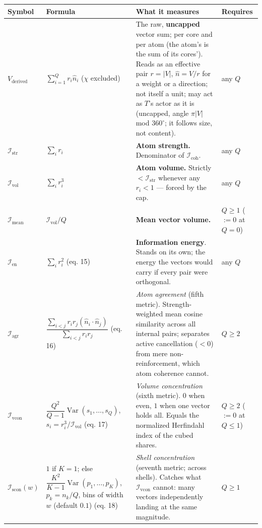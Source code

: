 \documentclass[10.5pt]{article}
\begin{document}
{\small\setlength{\tabcolsep}{4pt}\begin{longtable}{L{1.8cm}L{4.0cm}L{8.1cm}L{2.1cm}}
\toprule
\textbf{Symbol} & \textbf{Formula} & \textbf{What it measures} & \textbf{Requires} \\
\midrule
\endhead
$V_{\text{derived}}$ & $\displaystyle\sum_{i=1}^{Q}r_i\hat n_i$ ($\chi$ excluded) & The raw, \textbf{uncapped} vector sum; per core and per atom (the atom's is the sum of its cores'). Reads as an effective pair $r=\lvert V\rvert$, $\hat n=V/r$ for a weight or a direction; not itself a unit; may act as $T$'s actor as it is (uncapped, angle $\pi\lvert V\rvert$ mod $360^\circ$; it follows size, not content). & any $Q$ \\
$\mathcal{I}_{\mathrm{str}}$ & $\displaystyle\sum_ir_i$ & \textbf{Atom strength.} Denominator of $\mathcal{I}_{\mathrm{coh}}$. & any $Q$ \\
$\mathcal{I}_{\mathrm{vol}}$ & $\displaystyle\sum_ir_i^3$ & \textbf{Atom volume.} Strictly $<\mathcal{I}_{\mathrm{str}}$ whenever any $r_i<1$ — forced by the cap. & any $Q$ \\
$\mathcal{I}_{\mathrm{mean}}$ & $\mathcal{I}_{\mathrm{vol}}/Q$ & \textbf{Mean vector volume.} & $Q\ge1$ ($:=0$ at $Q=0$) \\
$\mathcal{I}_{\mathrm{en}}$ & $\displaystyle\sum_ir_i^2$ (eq. 15) & \textbf{Information energy}. Stands on its own; the energy the vectors would carry if every pair were orthogonal. & any $Q$ \\
$\mathcal{I}_{\mathrm{agr}}$ & $\dfrac{\sum_{i<j}r_ir_j(\hat n_i\cdot\hat n_j)}{\sum_{i<j}r_ir_j}$ (eq. 16) & \emph{Atom agreement} (fifth metric). Strength-weighted mean cosine similarity across all internal pairs; separates active cancellation ($<0$) from mere non-reinforcement, which atom coherence cannot. & $Q\ge2$ \\
$\mathcal{I}_{\mathrm{vcon}}$ & $\dfrac{Q^2}{Q-1}\operatorname{Var}(s_1,\ldots,s_Q)$, $s_i=r_i^3/\mathcal{I}_{\mathrm{vol}}$ (eq. 17) & \emph{Volume concentration} (sixth metric). $0$ when even, $1$ when one vector holds all. Equals the normalized Herfindahl index of the cubed shares. & $Q\ge2$ ($:=0$ at $Q\le1$) \\
$\mathcal{I}_{\mathrm{scon}}(w)$ & $1$ if $K=1$; else $\dfrac{K^2}{K-1}\operatorname{Var}(p_1,\ldots,p_K)$, $p_k=n_k/Q$, bins of width $w$ (default $0.1$) (eq. 18) & \emph{Shell concentration} (seventh metric; across shells). Catches what $\mathcal{I}_{\mathrm{vcon}}$ cannot: many vectors independently landing at the same magnitude. & $Q\ge1$ \\

\end{longtable}}
\end{document}
